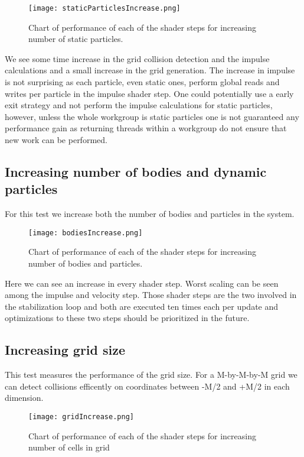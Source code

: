 \begin{figure}[H]
  \centering
  \texttt{[image: staticParticlesIncrease.png]}
  \caption{Chart of performance of each of the shader steps for increasing number of static particles.}
\end{figure}

We see some time increase in the grid collision detection and the impulse calculations
and a small increase in the grid generation.
The increase in impulse is not surprising as each particle, even static ones, perform
global reads and writes per particle in the impulse shader step. One could potentially
use a early exit strategy and not perform the impulse calculations for static particles,
however, unless the whole workgroup is static particles one is not guaranteed
any performance gain as returning threads within a workgroup do not ensure
that new work can be performed.

\subsection{Increasing number of bodies and dynamic particles}
For this test we increase both the number of bodies and particles in the system.
\begin{figure}[H]
  \centering
  \texttt{[image: bodiesIncrease.png]}
  \caption{Chart of performance of each of the shader steps for increasing number of bodies and particles.}
\end{figure}

Here we can see an increase in every shader step.
Worst scaling can be seen among the impulse and velocity step. Those shader steps are the two involved
in the stabilization loop and both are executed ten times each per update and optimizations
to these two steps should be prioritized in the future.

\subsection{Increasing grid size}
This test measures the performance of the grid size. For a M-by-M-by-M grid we can detect collisions
efficently on coordinates between -M/2 and +M/2 in each dimension.

\begin{figure}[H]
  \centering
  \texttt{[image: gridIncrease.png]}
  \caption{Chart of performance of each of the shader steps for increasing number of cells in grid}
\end{figure}

